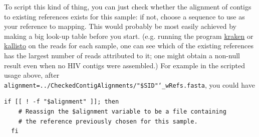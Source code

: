 \documentclass{article}
\let\c\texttt
\newcommand{\www}{\color{blue} \underline}
\begin{document}
To script this kind of thing, you can just check whether the alignment of contigs to existing references exists for this sample: if not, choose a sequence to use as your reference to mapping.
This would probably be most easily achieved by making a big look-up table before you start.
(e.g. running the program \href{https://ccb.jhu.edu/software/kraken/}{\www{kraken}} or \href{https://pachterlab.github.io/kallisto/}{\www{kallisto}} on the reads for each sample, one can see which of the existing references has the largest number of reads attributed to it; one might obtain a non-null result even when no HIV contigs were assembled.)
For example in the scripted usage above, after \\\c{alignment=../CheckedContigAlignments/"\$SID"\char`_wRefs.fasta}, you could have
\begin{Verbatim}[samepage=true]
  if [[ ! -f "$alignment" ]]; then
    # Reassign the $alignment variable to be a file containing
    # the reference previously chosen for this sample.
  fi
\end{Verbatim}
\end{document}
